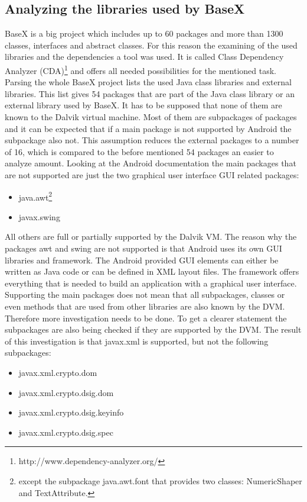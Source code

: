 \subsection{Analyzing the libraries used by BaseX}
\label{sec:migration:analyzing-the-libraries-used-by-basex}
BaseX is a big project which includes up to 60 packages and more than 1300 classes, interfaces and abstract classes.
For this reason the examining of the used libraries and the dependencies a tool was used.
It is called Class Dependency Analyzer (CDA)\footnote{http://www.dependency-analyzer.org/} and offers all needed possibilities for the mentioned task.
Parsing the whole BaseX project lists the used Java class libraries and external libraries.
This list gives 54 packages that are part of the Java class library or an external library used by BaseX.
It has to be supposed that none of them are known to the Dalvik virtual machine.
Most of them are subpackages of packages and it can be expected that if a main package is not supported by Android the subpackage also not. 
This assumption reduces the external packages to a number of 16, which is compared to the before mentioned 54 packages an easier to analyze amount.
Looking at the Android documentation the main packages that are not supported are just the two graphical user interface GUI related packages:
\begin{itemize}
  \item java.awt\footnote{except the subpackage java.awt.font that provides two classes: NumericShaper and TextAttribute.}
  \item javax.swing
\end{itemize}
All others are full or partially supported by the Dalvik VM.
The reason why the packages awt and swing are not supported is that Android uses its own GUI libraries and framework.
The Android provided GUI elements can either be written as Java code or can be defined in XML layout files.
The framework offers everything that is needed to build an application with a graphical user interface.\\
Supporting the main packages does not mean that all subpackages, classes or even methods that are used from other libraries are also known by the DVM.
Therefore more investigation needs to be done.
To get a clearer statement the subpackages are also being checked if they are supported by the DVM.
The result of this investigation is that javax.xml is supported, but not the following subpackages:
\begin{itemize}
  \item javax.xml.crypto.dom
  \item javax.xml.crypto.dsig.dom
  \item javax.xml.crypto.dsig.keyinfo
  \item javax.xml.crypto.dsig.spec
\end{itemize}
